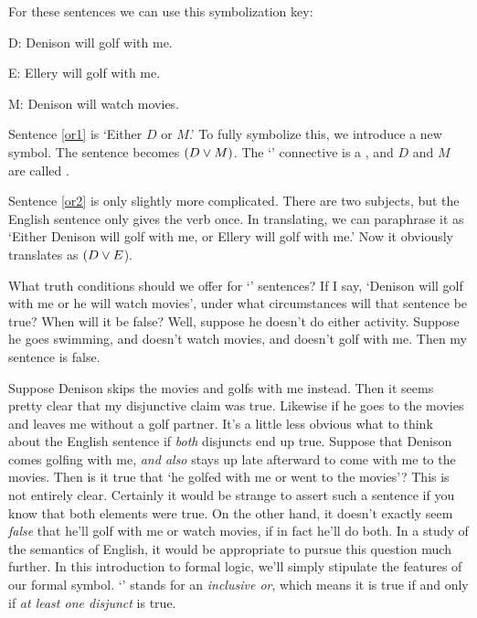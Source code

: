For these sentences we can use this symbolization key:

\begin{ekey}
\item[D:] Denison will golf with me.
\item[E:] Ellery will golf with me.
\item[M:] Denison will watch movies.
\end{ekey}

Sentence \ref{or1} is `Either $D$ or $M$.' To fully symbolize this, we introduce a new symbol. The sentence becomes $(D \vee M)$. The `\eor' connective is a , and $D$ and $M$ are called .

Sentence \ref{or2} is only slightly more complicated. There are two subjects, but the English sentence only gives the verb once. In translating, we can paraphrase it as `Either Denison will golf with me, or Ellery will golf with me.' Now it obviously translates as $(D \vee E$).


What truth conditions should we offer for `\eor' sentences? If I say, `Denison will golf with me or he will watch movies', under what circumstances will that sentence be true? When will it be false? Well, suppose he doesn't do either activity. Suppose he goes swimming, and doesn't watch movies, and doesn't golf with me. Then my sentence is false.

Suppose Denison skips the movies and golfs with me instead. Then it seems pretty clear that my disjunctive claim was true. Likewise if he goes to the movies and leaves me without a golf partner. It's a little less obvious what to think about the English sentence if \emph{both} disjuncts end up true. Suppose that Denison comes golfing with me, \emph{and also} stays up late afterward to come with me to the movies. Then is it true that `he golfed with me or went to the movies'? This is not entirely clear. Certainly it would be strange to assert such a sentence if you know that both elements were true. On the other hand, it doesn't exactly seem \emph{false} that he'll golf with me or watch movies, if in fact he'll do both. In a study of the semantics of English, it would be appropriate to pursue this question much further. In this introduction to formal logic, we'll simply stipulate the features of our formal symbol. `\eor' stands for an \emph{inclusive or}, which means it is true if and only if \emph{at least one disjunct} is true.

